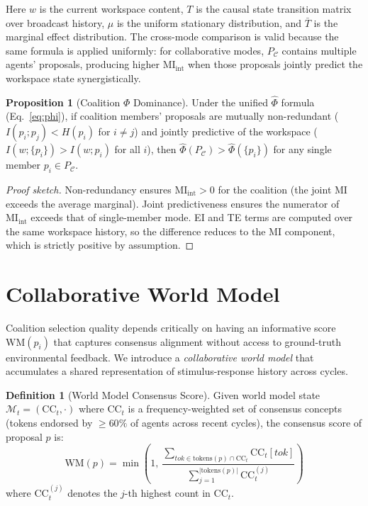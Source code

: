 \documentclass[11pt]{article}
\theoremstyle{definition}
\newtheorem{definition}{Definition}
\newtheorem{proposition}{Proposition}
\begin{document}
Here $w$ is the current workspace content, $T$ is the causal state transition matrix over
broadcast history, $\mu$ is the uniform stationary distribution, and $\bar{T}$ is the
marginal effect distribution. The cross-mode comparison is valid because the same formula
is applied uniformly: for collaborative modes, $P_{\mathcal{C}}$ contains multiple agents'
proposals, producing higher $\text{MI}_{\text{int}}$ when those proposals jointly predict
the workspace state synergistically.

\begin{proposition}[Coalition $\Phi$ Dominance]
\label{prop:dominance}
Under the unified $\hat{\Phi}$ formula (Eq.~\eqref{eq:phi}), if coalition members' proposals
are mutually non-redundant ($I(p_i; p_j) < H(p_i)$ for $i \neq j$) and jointly predictive
of the workspace ($I(w; \{p_i\}) > I(w; p_i)$ for all $i$), then
$\hat{\Phi}(P_{\mathcal{C}}) > \hat{\Phi}(\{p_i\})$ for any single member $p_i \in P_{\mathcal{C}}$.
\end{proposition}
\begin{proof}[Proof sketch]
Non-redundancy ensures $\text{MI}_{\text{int}} > 0$ for the coalition (the joint MI exceeds
the average marginal). Joint predictiveness ensures the numerator of $\text{MI}_{\text{int}}$
exceeds that of single-member mode. EI and TE terms are computed over the same workspace
history, so the difference reduces to the MI component, which is strictly positive by
assumption.
\end{proof}


\section{Collaborative World Model}
\label{sec:wm}

Coalition selection quality depends critically on having an informative score $\text{WM}(p_i)$
that captures consensus alignment without access to ground-truth environmental feedback.
We introduce a \emph{collaborative world model} that accumulates a shared representation
of stimulus-response history across cycles.

\begin{definition}[World Model Consensus Score]
\label{def:wm_score}
Given world model state $\mathcal{M}_t = (\text{CC}_t, \cdot)$ where $\text{CC}_t$ is a
frequency-weighted set of consensus concepts (tokens endorsed by $\geq 60\%$ of agents
across recent cycles), the consensus score of proposal $p$ is:
\begin{equation}
\text{WM}(p) = \min\!\left(1,\ \frac{\sum_{tok \in \text{tokens}(p) \cap \text{CC}_t}
  \text{CC}_t[tok]}{\sum_{j=1}^{|\text{tokens}(p)|} \text{CC}_t^{(j)}}\right)
\end{equation}
where $\text{CC}_t^{(j)}$ denotes the $j$-th highest count in $\text{CC}_t$.
\end{definition}
\end{document}
